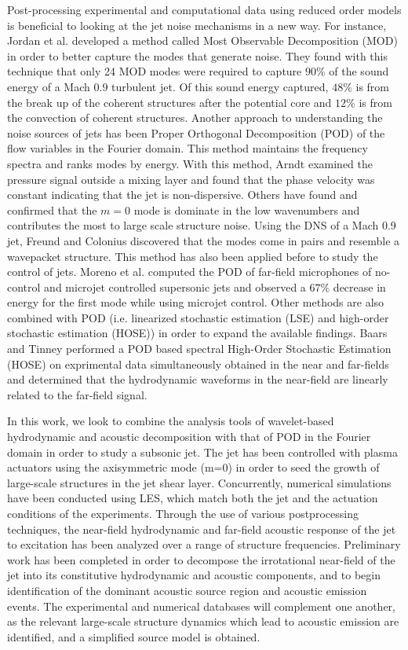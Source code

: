 \documentclass[english]{aiaa-tc}
\begin{document}
Post-processing experimental and computational data using reduced order models is beneficial to looking at the jet noise mechanisms in a new way.
 For instance, Jordan et al.\cite{jordan2007} developed a method called Most Observable Decomposition (MOD) in order to better capture the modes that generate noise. They found with this technique that only 24 MOD modes were required to capture $90\%$ of the sound energy of a Mach $0.9$ turbulent jet. Of this sound energy captured, $48\%$ is from the break up of the coherent structures after the potential core and $12\%$ is from the convection of coherent structures. 
Another approach to understanding the noise sources of jets has been Proper Orthogonal Decomposition (POD) of the flow variables in the Fourier domain. This method maintains the frequency spectra and ranks modes by energy. 
With this method, Arndt\cite{Arndt1997} examined the pressure signal outside a mixing layer and found that the phase velocity was constant indicating that the jet is non-dispersive.  
Others have found and confirmed that the $m=0$ mode is dominate in the low wavenumbers and contributes the most to large scale structure noise.\cite{hall2007,tinney2007}  
Using the DNS of a Mach 0.9 jet, Freund and Colonius\cite{freund2002} discovered that the modes come in pairs and resemble a wavepacket structure.
This method has also been applied before to study the control of jets. Moreno et al.\cite{moreno2003} computed the POD of far-field microphones of no-control and microjet controlled supersonic jets and observed a  $67\%$ decrease in energy for the first mode while using microjet control.
Other methods are also combined with POD (i.e. linearized stochastic estimation (LSE) and high-order stochastic estimation (HOSE)) in order to expand the available findings. Baars and Tinney\cite{baars2010} performed a POD based spectral High-Order Stochastic Estimation (HOSE) on exprimental data simultaneously obtained in the near and far-fields and determined that the hydrodynamic waveforms in the near-field are linearly related to the far-field signal. 

In this work, we look to combine the analysis tools of wavelet-based hydrodynamic and acoustic decomposition with that of POD in the Fourier domain in order to study a subsonic jet. 
The jet has been controlled with plasma actuators using the axisymmetric mode (m=0) in order to seed the growth of large-scale structures in the jet shear layer. Concurrently, numerical simulations have been conducted using LES, which match both the jet and the actuation conditions of the experiments. Through the use of various postprocessing techniques, the near-field hydrodynamic and far-field acoustic response of the jet to excitation has been analyzed over a range of structure frequencies. Preliminary work has been completed in order to decompose the irrotational near-field of the jet into its constitutive hydrodynamic and acoustic components, and to begin identification of the dominant acoustic source region and acoustic emission events. The experimental and numerical databases will complement one another, as the relevant large-scale structure dynamics which lead to acoustic emission are identified, and a simplified source model is obtained. 
\end{document}
